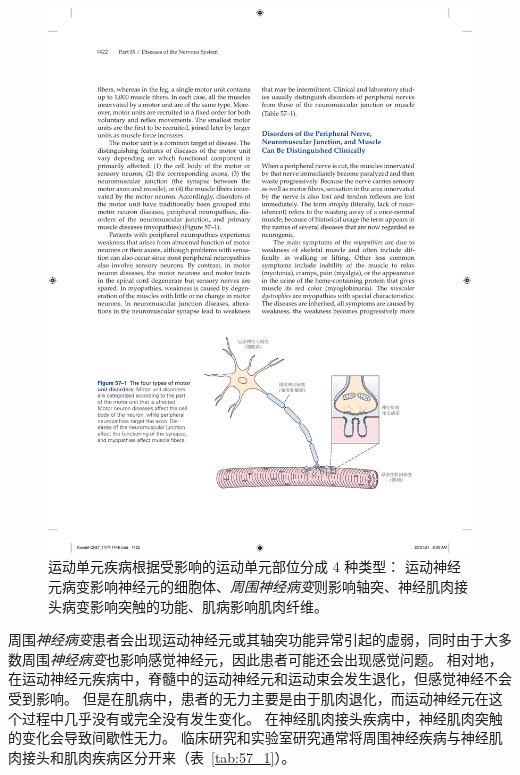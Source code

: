 \begin{figure}[htbp]
	\centering
	\includegraphics[width=0.91\linewidth]{chap57/fig_57_1}
	\caption{运动单元疾病根据受影响的运动单元部位分成 4 种类型：
		运动神经元病变影响神经元的细胞体、\textit{周围神经病变}则影响轴突、神经肌肉接头病变影响突触的功能、肌病影响肌肉纤维。}
	\label{fig:57_1}
\end{figure}


周围\textit{神经病变}患者会出现运动神经元或其轴突功能异常引起的虚弱，同时由于大多数周围\textit{神经病变}也影响感觉神经元，因此患者可能还会出现感觉问题。
相对地，在运动神经元疾病中，脊髓中的运动神经元和运动束会发生退化，但感觉神经不会受到影响。
但是在肌病中，患者的无力主要是由于肌肉退化，而运动神经元在这个过程中几乎没有或完全没有发生变化。
在神经肌肉接头疾病中，神经肌肉突触的变化会导致间歇性无力。
临床研究和实验室研究通常将周围神经疾病与神经肌肉接头和肌肉疾病区分开来（表~\ref{tab:57_1}）。



